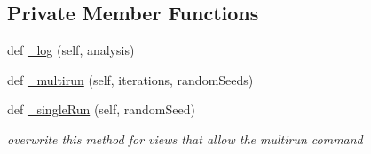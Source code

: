 \subsection*{Private Member Functions}
\begin{DoxyCompactItemize}
\item 
def \hyperlink{class_mu_mo_t_1_1_mu_mo_tview_a8b4ffd0e4999bd45c6ca33fe0f40d1e3}{\+\_\+log} (self, analysis)
\item 
def \hyperlink{class_mu_mo_t_1_1_mu_mo_tview_a4d4a00545816bf68f912f5ea5a449c48}{\+\_\+multirun} (self, iterations, random\+Seeds)
\item 
def \hyperlink{class_mu_mo_t_1_1_mu_mo_tview_a51d421aacb4cd83af5f1c2e60c3dff9c}{\+\_\+single\+Run} (self, random\+Seed)
\begin{DoxyCompactList}\small\item\em overwrite this method for views that allow the \textquotesingle{}multirun\textquotesingle{} command \end{DoxyCompactList}\end{DoxyCompactItemize}
